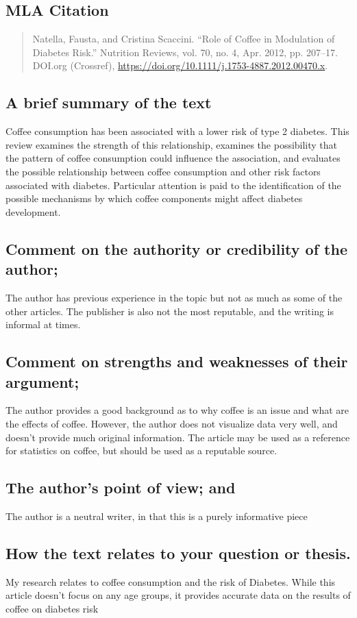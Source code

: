 \documentclass{scrartcl}
\begin{document}
\subsection{MLA Citation}
\label{sec:org9c0edc5}
\begin{quote}
Natella, Fausta, and Cristina Scaccini. “Role of Coffee in Modulation of Diabetes Risk.” Nutrition Reviews, vol. 70, no. 4, Apr. 2012, pp. 207–17. DOI.org (Crossref), \url{https://doi.org/10.1111/j.1753-4887.2012.00470.x}.
\end{quote}
\subsection{A brief summary of the text}
\label{sec:org7fa0d85}
Coffee consumption has been associated with a lower risk of type 2 diabetes. This review examines the strength of this relationship, examines the possibility that the pattern of coffee consumption could influence the association, and evaluates the possible relationship between coffee consumption and other risk factors associated with diabetes. Particular attention is paid to the identification of the possible mechanisms by which coffee components might affect diabetes development.
\subsection{Comment on the authority or credibility of the author;}
\label{sec:org06f9ea7}
The author has previous experience in the topic but not as much as some of the other articles. The publisher is also not the most reputable, and the writing is informal at times.
\subsection{Comment on strengths and weaknesses of their argument;}
\label{sec:orge7ea0c6}
The author provides a good background as to why coffee is an issue and what are the effects of coffee. However, the author does not visualize data very well, and doesn't provide much original information. The article may be used as a reference for statistics on coffee, but should be used as a reputable source.
\subsection{The author’s point of view; and}
\label{sec:orgce941b8}
The author is a neutral writer, in that this is a purely informative piece
\subsection{How the text relates to your question or thesis.}
\label{sec:orga8b707d}
My research relates to coffee consumption and the risk of Diabetes. While this article doesn't focus on any age groups, it provides accurate data on the results of coffee on diabetes risk
\end{document}
